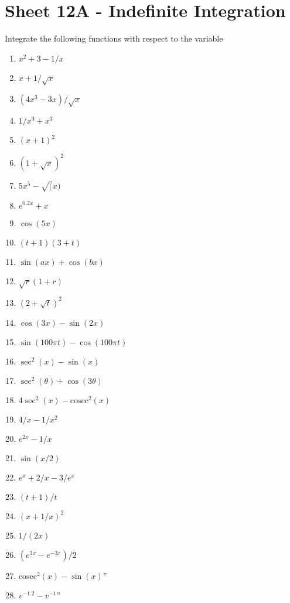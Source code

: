 \documentclass[
  english,
  11pt,
  oneside]{book}
\providecommand{\tightlist}{%
  \setlength{\itemsep}{0pt}\setlength{\parskip}{0pt}}
\theoremstyle{definition}
\theoremstyle{definition}
\theoremstyle{definition}
\theoremstyle{definition}
\theoremstyle{remark}
\begin{document}
\section{Sheet 12A - Indefinite Integration}\label{sheet-12a---indefinite-integration}

Integrate the following functions with respect to the variable

\begin{enumerate}
\def\labelenumi{\arabic{enumi}.}
\tightlist
\item
  \(x^2+3-1/x\)
\item
  \(x+1/\sqrt{x}\)
\item
  \((4x^3-3x)/\sqrt{x}\)
\item
  \(1/x^3+x^3\)
\item
  \((x+1)^2\)
\item
  \((1+\sqrt{x})^2\)
\item
  \(5x^5-\sqrt(x)\)
\item
  \(e^{0.2x}+x\)
\item
  \(\cos(5x)\)
\item
  \((t+1)(3+t)\)
\item
  \(\sin(ax)+\cos(bx)\)
\item
  \(\sqrt{r}(1+r)\)
\item
  \((2+\sqrt{t})^2\)
\item
  \(\cos(3x)-\sin(2x)\)
\item
  \(\sin(100\pi t)-\cos(100\pi t)\)
\item
  \(\sec^2(x)-\sin(x)\)
\item
  \(\sec^2(\theta)+\cos(3\theta)\)
\item
  \(4\sec^2(x)-\text{cosec}^2(x)\)
\item
  \(4/x-1/x^2\)
\item
  \(e^{2x}-1/x\)
\item
  \(\sin(x/2)\)
\item
  \(e^x+2/x-3/e^x\)
\item
  \((t+1)/t\)
\item
  \((x+1/x)^2\)
\item
  \(1/(2x)\)
\item
  \((e^{3x}-e^{-3x})/2\)
\item
  \(\text{cosec}^2(x)-\sin(x)\)''
\item
  \(v^{-1.2}-v^{-1}\)''
\end{enumerate}
\end{document}
